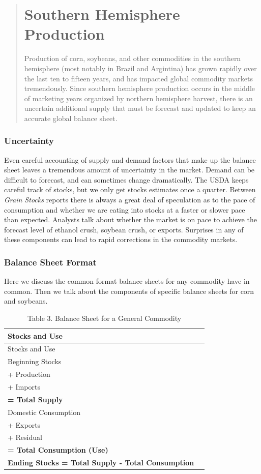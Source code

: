\documentclass[]{book}
\theoremstyle{definition}
\theoremstyle{definition}
\theoremstyle{remark}
\begin{document}
\begin{quote}
\chapter{Southern Hemisphere
Production}\label{southern-hemisphere-production}

Production of corn, soybeans, and other commodities in the southern
hemisphere (most notably in Brazil and Argintina) has grown rapidly over
the last ten to fifteen years, and has impacted global commodity markets
tremendously. Since southern hemisphere production occurs in the middle
of marketing years organized by northern hemisphere harvest, there is an
uncertain additional supply that must be forecast and updated to keep an
accurate global balance sheet.
\end{quote}

\subsection{Uncertainty}\label{uncertainty}

Even careful accounting of supply and demand factors that make up the
balance sheet leaves a tremendous amount of uncertainty in the market.
Demand can be difficult to forecast, and can sometimes change
dramatically. The USDA keeps careful track of stocks, but we only get
stocks estimates once a quarter. Between \emph{Grain Stocks} reports
there is always a great deal of speculation as to the pace of
consumption and whether we are eating into stocks at a faster or slower
pace than expected. Analysts talk about whether the market is on pace to
achieve the forecast level of ethanol crush, soybean crush, or exports.
Surprises in any of these components can lead to rapid corrections in
the commodity markets.

\subsection{Balance Sheet Format}\label{balance-sheet-format}

Here we discuss the common format balance sheets for any commodity have
in common. Then we talk about the components of specific balance sheets
for corn and soybeans.

\begin{longtable}[]{@{}ll@{}}
\caption{Table 3. Balance Sheet for a General Commodity}\tabularnewline
\toprule
Stocks and Use &\tabularnewline
\midrule
\endfirsthead
\toprule
Stocks and Use &\tabularnewline
\midrule
\endhead
Beginning Stocks &\tabularnewline
+ Production &\tabularnewline
+ Imports &\tabularnewline
\textbf{= Total Supply} &\tabularnewline
Domestic Consumption &\tabularnewline
+ Exports &\tabularnewline
+ Residual &\tabularnewline
\textbf{= Total Consumption (Use)} &\tabularnewline
\textbf{Ending Stocks = Total Supply - Total Consumption}
&\tabularnewline
\bottomrule
\end{longtable}
\end{document}
